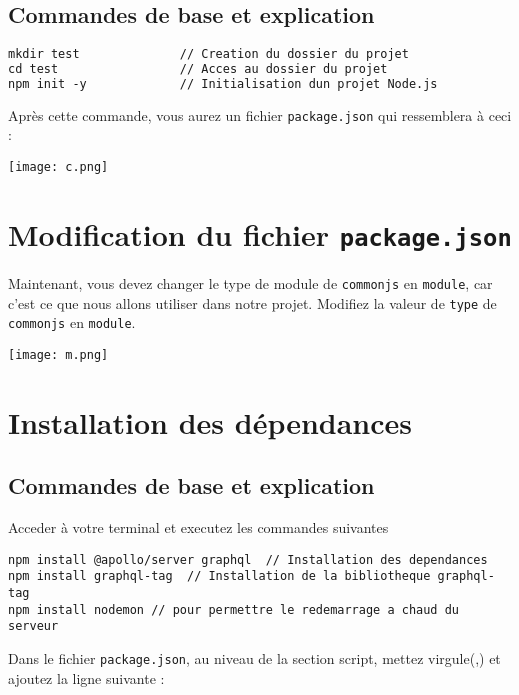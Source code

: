 \documentclass{article}
\begin{document}
\subsection{Commandes de base et explication}

\begin{lstlisting}[language=GraphQL,style=custombash]
mkdir test              // Creation du dossier du projet
cd test                 // Acces au dossier du projet
npm init -y             // Initialisation dun projet Node.js
\end{lstlisting}

Après cette commande, vous aurez un fichier \texttt{package.json} qui ressemblera à ceci :

\begin{center}
\texttt{[image: c.png]}
\end{center}

\section{Modification du fichier \texttt{package.json}}
Maintenant, vous devez changer le type de module de \texttt{commonjs} en \texttt{module}, car c'est ce que nous allons utiliser dans notre projet. Modifiez la valeur de \texttt{type} de \texttt{commonjs} en \texttt{module}.

\begin{center}
\texttt{[image: m.png]}
\end{center}

\section{Installation des dépendances}

\subsection{Commandes de base et explication}
Acceder à  votre terminal et executez les commandes suivantes
\begin{lstlisting}[style=custombash]
npm install @apollo/server graphql  // Installation des dependances
npm install graphql-tag  // Installation de la bibliotheque graphql-tag
npm install nodemon // pour permettre le redemarrage a chaud du serveur
\end{lstlisting}

Dans le fichier \texttt{package.json}, au niveau de la section script, mettez virgule(,) et ajoutez la ligne suivante :
\end{document}

